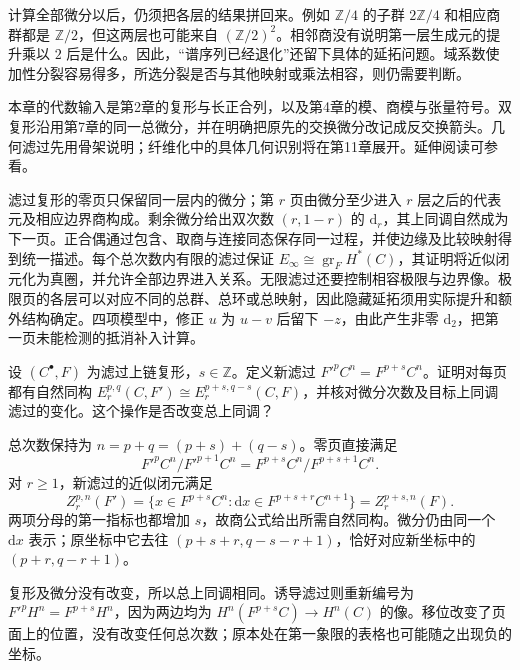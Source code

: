 \ProseParagraphBreak

计算全部微分以后，仍须把各层的结果拼回来。例如 \(\mathbb Z/4\) 的子群 \(2\mathbb Z/4\) 和相应商群都是 \(\mathbb Z/2\)，但这两层也可能来自 \((\mathbb Z/2)^2\)。相邻商没有说明第一层生成元的提升乘以 \(2\) 后是什么。因此，“谱序列已经退化”还留下具体的延拓问题。域系数使加性分裂容易得多，所选分裂是否与其他映射或乘法相容，则仍需要判断。

\ProseParagraphBreak

本章的代数输入是第2章的复形与长正合列，以及第4章的模、商模与张量符号。双复形沿用第7章的同一总微分，并在明确把原先的交换微分改记成反交换箭头。几何滤过先用骨架说明；纤维化中的具体几何识别将在第11章展开。延伸阅读可参看\cite[第三章，Spectral Sequences and Applications]{BottTu1982}。








\begin{chaptersummary}
	滤过复形的零页只保留同一层内的微分；第 \(r\) 页由微分至少进入 \(r\) 层之后的代表元及相应边界商构成。剩余微分给出双次数 \((r,1-r)\) 的 \(\mathrm d_r\)，其上同调自然成为下一页。正合偶通过包含、取商与连接同态保存同一过程，并使边缘及比较映射得到统一描述。每个总次数内有限的滤过保证 \(E_\infty\cong\operatorname{gr}_F H^*(C)\)，其证明将近似闭元化为真圈，并允许全部边界进入关系。无限滤过还要控制相容极限与边界像。极限页的各层可以对应不同的总群、总环或总映射，因此隐藏延拓须用实际提升和额外结构确定。四项模型中，修正 \(u\) 为 \(u-v\) 后留下 \(-z\)，由此产生非零 \(\mathrm d_2\)，把第一页未能检测的抵消补入计算。
\end{chaptersummary}

\BookExercises

\begin{exercise}\label{g2:ex:shifted-filtration-indices}
	设 \((C^\bullet,F)\) 为滤过上链复形，\(s\in\mathbb Z\)。定义新滤过 \(F'^pC^n=F^{p+s}C^n\)。证明对每页都有自然同构 \(E_r^{p,q}(C,F')\cong E_r^{p+s,q-s}(C,F)\)，并核对微分次数及目标上同调滤过的变化。这个操作是否改变总上同调？
\end{exercise}
\begin{solution}
	总次数保持为 \(n=p+q=(p+s)+(q-s)\)。零页直接满足
	\[
		F'^pC^n/F'^{p+1}C^n=F^{p+s}C^n/F^{p+s+1}C^n.
	\]
	对 \(r\ge1\)，新滤过的近似闭元满足
	\[
		Z_r^{p,n}(F')=\{x\in F^{p+s}C^n:\mathrm dx\in F^{p+s+r}C^{n+1}\}=Z_r^{p+s,n}(F).
	\]
	两项分母的第一指标也都增加 \(s\)，故商公式给出所需自然同构。微分仍由同一个 \(\mathrm dx\) 表示；原坐标中它去往 \((p+s+r,q-s-r+1)\)，恰好对应新坐标中的 \((p+r,q-r+1)\)。

	复形及微分没有改变，所以总上同调相同。诱导滤过则重新编号为 \(F'^pH^n=F^{p+s}H^n\)，因为两边均为 \(H^n(F^{p+s}C)\to H^n(C)\) 的像。移位改变了页面上的位置，没有改变任何总次数；原本处在第一象限的表格也可能随之出现负的坐标。
\end{solution}


